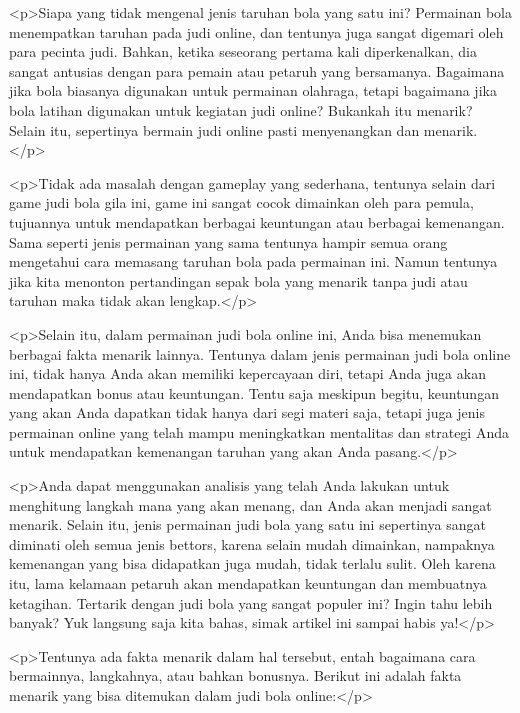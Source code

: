 {<p>Siapa yang tidak mengenal jenis taruhan bola yang satu ini? Permainan bola menempatkan taruhan pada judi online, dan tentunya juga sangat digemari oleh para pecinta judi. Bahkan, ketika seseorang pertama kali diperkenalkan, dia sangat antusias dengan para pemain atau petaruh yang bersamanya. Bagaimana jika bola biasanya digunakan untuk permainan olahraga, tetapi bagaimana jika bola latihan digunakan untuk kegiatan judi online? Bukankah itu menarik? Selain itu, sepertinya bermain judi online pasti menyenangkan dan menarik.</p>



<p>Tidak ada masalah dengan gameplay yang sederhana, tentunya selain dari game judi bola gila ini, game ini sangat cocok dimainkan oleh para pemula, tujuannya untuk mendapatkan berbagai keuntungan atau berbagai kemenangan. Sama seperti jenis permainan yang sama tentunya hampir semua orang mengetahui cara memasang taruhan bola pada permainan ini. Namun tentunya jika kita menonton pertandingan sepak bola yang menarik tanpa judi atau taruhan maka tidak akan lengkap.</p>



<p>Selain itu, dalam permainan judi bola online ini, Anda bisa menemukan berbagai fakta menarik lainnya. Tentunya dalam jenis permainan judi bola online ini, tidak hanya Anda akan memiliki kepercayaan diri, tetapi Anda juga akan mendapatkan bonus atau keuntungan. Tentu saja meskipun begitu, keuntungan yang akan Anda dapatkan tidak hanya dari segi materi saja, tetapi juga jenis permainan online yang telah mampu meningkatkan mentalitas dan strategi Anda untuk mendapatkan kemenangan taruhan yang akan Anda pasang.</p>



<p>Anda dapat menggunakan analisis yang telah Anda lakukan untuk menghitung langkah mana yang akan menang, dan Anda akan menjadi sangat menarik. Selain itu, jenis permainan judi bola yang satu ini sepertinya sangat diminati oleh semua jenis bettors, karena selain mudah dimainkan, nampaknya kemenangan yang bisa didapatkan juga mudah, tidak terlalu sulit. Oleh karena itu, lama kelamaan petaruh akan mendapatkan keuntungan dan membuatnya ketagihan. Tertarik dengan judi bola yang sangat populer ini? Ingin tahu lebih banyak? Yuk langsung saja kita bahas, simak artikel ini sampai habis ya!</p>



<p>Tentunya ada fakta menarik dalam hal tersebut, entah bagaimana cara bermainnya, langkahnya, atau bahkan bonusnya. Berikut ini adalah fakta menarik yang bisa ditemukan dalam judi bola online:</p>



}
